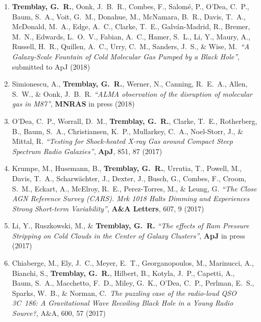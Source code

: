 \documentclass[11pt]{article}
\begin{document}
\begin{enumerate}%


\item \textbf{Tremblay, G.~R.}, Oonk, J.~B.~R., Combes, F., Salom\'{e}, P., O'Dea, C.~P., Baum, S.~A., Voit, G.~M., Donahue, M., McNamara, B.~R., Davis, T.~A., McDonald, M.~A., Edge, A.~C., Clarke, T.~E., Galv\'{a}n-Madrid, R., Bremer, M.~N., Edwards, L.~O.~V., Fabian, A.~C.,  Hamer, S.~L., Li, Y., Maury, A., Russell, H.~R., Quillen, A.~C., Urry, C.~M., Sanders, J.~S., \& Wise, M.\ \textit{``A Galaxy-Scale Fountain of Cold Molecular Gas Pumped by a Black Hole''}, submitted to ApJ (2018)

\item Simionescu, A., \textbf{Tremblay, G.~R.}, Werner, N., Canning, R.~E.~A., Allen, S.~W., \& Oonk, J.~B.~R.
\textit{``ALMA observation of the disruption of
molecular gas in M87''}, \textbf{MNRAS} in press (2018)


\item O'Dea, C.~P., Worrall, D.~M., \textbf{Tremblay, G.~R.}, Clarke, T.~E., Rotherberg, B., Baum, S.~A.,
Christiansen, K.~P., Mullarkey, C.~A., Noel-Storr,
J., \& Mittal, R. \textit{``Testing for Shock-heated X-ray Gas around Compact Steep Spectrum Radio Galaxies''}, \textbf{ApJ}, 851, 87 (2017)


\item Krumpe, M., Husemann, B., \textbf{Tremblay, G.~R.}, Urrutia, T., Powell, M., Davis, T.~A., Scharw\"{a}chter, J., Dexter, J., Busch, G., Combes, F., Croom, S.~M.,
Eckart, A., McElroy, R.~E., Perez-Torres, M., \& Leung, G. \textit{``The Close AGN Reference Survey (CARS). Mrk 1018 Halts Dimming and Experiences Strong Short-term Variability''}, \textbf{A\&A Letters}, 607, 9 (2017)


\item Li, Y., Ruszkowski, M., \& \textbf{Tremblay, G.~R.} \textit{``The effects of Ram Pressure Stripping on Cold Clouds in the Center of Galaxy Clusters''}, \textbf{ApJ} in press (2017)


\item Chiaberge, M., Ely, J.~C., Meyer, E.~T., Georganopoulos, M., Marinucci, A., Bianchi, S.,  \textbf{Tremblay, G.~R.}, Hilbert, B.,
Kotyla, J.~P., Capetti, A., Baum, S.~A.,  Macchetto, F.~D., Miley, G.~K.,
O'Dea, C.~P., Perlman, E.~S., Sparks, W.~B., \& Norman, C.\ \textit{The puzzling case of the radio-loud QSO 3C~186: A Gravitational Wave Recoiling Black Hole in a Young Radio Source?}, A\&A, 600, 57 (2017)



\end{enumerate}
\end{document}
